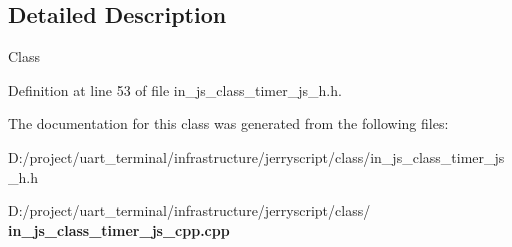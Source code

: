 \subsection{Detailed Description}
Class 

Definition at line 53 of file in\+\_\+js\+\_\+class\+\_\+timer\+\_\+js\+\_\+h.\+h.



The documentation for this class was generated from the following files\+:\begin{DoxyCompactItemize}
\item 
D\+:/project/uart\+\_\+terminal/infrastructure/jerryscript/class/in\+\_\+js\+\_\+class\+\_\+timer\+\_\+js\+\_\+h.\+h\item 
D\+:/project/uart\+\_\+terminal/infrastructure/jerryscript/class/\textbf{ in\+\_\+js\+\_\+class\+\_\+timer\+\_\+js\+\_\+cpp.\+cpp}\end{DoxyCompactItemize}
